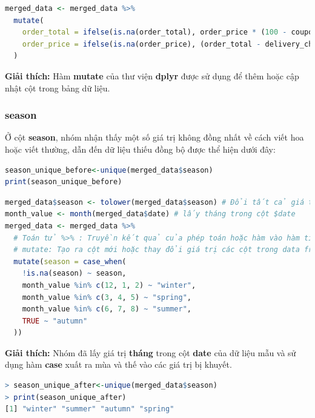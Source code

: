 \begin{lstlisting}[language=R, caption=Xử lý cột \textbf{order\_total} và \textbf{order\_price}]
merged_data <- merged_data %>%
  mutate(
    order_total = ifelse(is.na(order_total), order_price * (100 - coupon_discount) / 100 + delivery_charges, order_total),
    order_price = ifelse(is.na(order_price), (order_total - delivery_charges) * 100 / (100 - coupon_discount), order_price)
  )

\end{lstlisting}
\textbf{Giải thích:} Hàm \textbf{mutate} của thư viện \textbf{dplyr} được sử dụng để thêm hoặc cập nhật cột trong bảng dữ liệu.

\subsubsection{season}
Ở cột \textbf{season}, nhóm nhận thấy một số giá trị không đồng nhất về cách viết hoa hoặc viết thường, dẫn đến dữ liệu thiếu đồng bộ được thể hiện dưới đây:

\begin{lstlisting}[language=R, caption=Giá trị cột \textbf{season} ban đầu]
season_unique_before<-unique(merged_data$season)
print(season_unique_before)

\end{lstlisting}

\begin{lstlisting}[language=R, caption=Xử lý cột \textbf{season}]
merged_data$season <- tolower(merged_data$season) # Đổi tất cả giá trị mùa dạng viết thường
month_value <- month(merged_data$date) # lấy tháng trong cột $date
merged_data <- merged_data %>%
  # Toán tử %>% : Truyền kết quả của phép toán hoặc hàm vào hàm tiếp theo .
  # mutate: Tạo ra cột mới hoặc thay đổi giá trị các cột trong data frame
  mutate(season = case_when(
    !is.na(season) ~ season,
    month_value %in% c(12, 1, 2) ~ "winter",
    month_value %in% c(3, 4, 5) ~ "spring",
    month_value %in% c(6, 7, 8) ~ "summer",
    TRUE ~ "autumn"
  ))

\end{lstlisting}
\begin{boxH}
\textbf{Giải thích:} Nhóm đã lấy giá trị \textbf{tháng} trong cột \textbf{date} của dữ liệu mẫu và sử dụng hàm \textbf{case} xuất ra mùa và thế vào các giá trị bị khuyết. 
\end{boxH}
\begin{lstlisting}[language=R, caption=Dữ liệu cột \textbf{season} sau khi xử lý]
> season_unique_after<-unique(merged_data$season)
> print(season_unique_after)
[1] "winter" "summer" "autumn" "spring"
\end{lstlisting}

